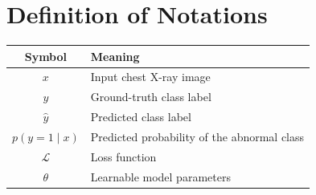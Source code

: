 \documentclass[12pt, oneside]{book}
\begin{document}
\chapter*{Definition of Notations}
\begin{flushleft}
    \begin{tabular}{|c|l|}
        \hline
        \textbf{Symbol} & \textbf{Meaning} \\
        \hline
        $x$ & Input chest X-ray image \\
        $y$ & Ground-truth class label \\
        $\hat{y}$ & Predicted class label \\
        $p(y=1 \mid x)$ & Predicted probability of the abnormal class \\
        $\mathcal{L}$ & Loss function \\
        $\theta$ & Learnable model parameters \\
        \hline
    \end{tabular}
\end{flushleft}

\mainmatter
\pagestyle{fancy}







\appendix

\end{document}

